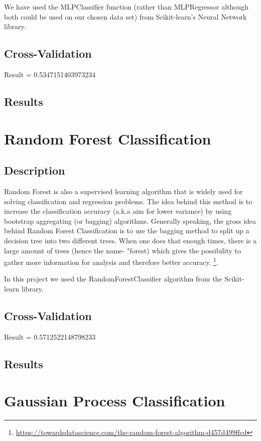 \documentclass[twocolumn]{scrartcl}
\begin{document}
We have used the MLPClassifier function (rather than MLPRegressor although both could be used on our  chosen data set) from Scikit-learn's Neural Network library.

\subsection{Cross-Validation}
Result = 0.5347151403973234
\subsection{Results}

\section{Random Forest Classification}
\subsection{Description}
Random Forest is also a supervised learning algorithm that is widely used for solving classification and regression problems. The idea behind this method is to increase the classification accuracy (a.k.a aim for lower variance) by using bootstrap aggregating (or bagging) algorithms. Generally speaking, the gross idea behind Random Forest Classification is to use the bagging method to split up a decision tree into two different trees. When one does that enough times, there is a large amount of trees (hence the name- "forest) which gives the possibility to gather more information for analysis and therefore better accuracy. \footnote{\url{https://towardsdatascience.com/the-random-forest-algorithm-d457d499ffcd}}.

In this project we used the RandomForestClassifier algorithm from the Scikit-learn library.

\subsection{Cross-Validation}
Result = 0.5712522148798233
\subsection{Results}

\section{Gaussian Process Classification}
\end{document}
